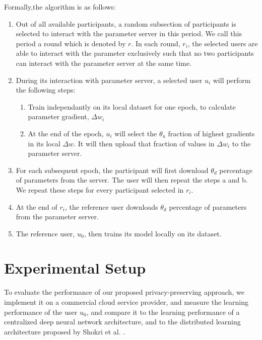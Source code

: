 \documentclass[conference]{IEEEtran}
\begin{document}
Formally,the algorithm is as follows:
\begin {enumerate}
\item Out of all available participants, a random subsection of participants is selected to interact with the parameter server in this
period. We call this period a round which is denoted by $r$. In each round, $r_i$, the selected users are able to interact with the parameter exclusively such that no two
participants can interact with the parameter server at the same time.
\item During its interaction with parameter server, a selected user $u_i$ will perform the following steps:
\begin {enumerate}
  \item Train independantly on its local dataset for one epoch, to calculate parameter gradient, $\Delta w_i$ 
  \item  At the end of the epoch, $u_i$ will select the $\theta_u$ fraction of highest gradients in its local $\Delta w$. It will then upload that fraction of values in $\Delta w_i$ to the parameter server.
  \end {enumerate}
\item For each subsequent epoch, the participant will first download $\theta_d$ percentage of parameters from the server. The
user will then repeat the steps a and b. We repeat these steps for every participant selected in $r_i$.
\item At the end of $r_i$, the reference user downloads $\theta_d$ percentage of parameters from the parameter server.
\item The reference user, $u_0$, then trains its model locally on its dataset. 
\end {enumerate}




\section{Experimental Setup}

To evaluate the performance of our proposed privacy-preserving approach, we implement it on a commercial cloud service provider, and measure the
learning performance of the user $u_0$, and compare it to the learning performance of a centralized deep neural network
architecture, and to the distributed learning architecture proposed by Shokri et al. \cite{shokri2015privacy}. 
\end{document}
